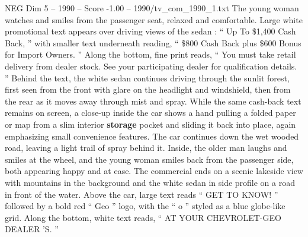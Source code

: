\begin{textsample}{NEG Dim 5 – 1990 – Score -1.00 – 1990/tv\_com\_1990\_1.txt}
The young woman watches and smiles from the passenger seat, relaxed and comfortable.
Large white promotional text appears over driving views of the sedan : “ Up To \$1,400 Cash Back, ” with smaller text underneath reading, “ \$800 Cash Back plus \$600 Bonus for Import Owners. ” Along the bottom, fine print reads, “ You must take retail delivery from dealer stock.
See your participating dealer for qualification details. ” Behind the text, the white sedan continues driving through the sunlit forest, first seen from the front with glare on the headlight and windshield, then from the rear as it moves away through mist and spray.
While the same cash-back text remains on screen, a close-up inside the car shows a hand pulling a folded paper or map from a slim interior \textbf{storage} pocket and sliding it back into place, again emphasizing small convenience features.
The car continues down the wet wooded road, leaving a light trail of spray behind it.
Inside, the older man laughs and smiles at the wheel, and the young woman smiles back from the passenger side, both appearing happy and at ease.
The commercial ends on a scenic lakeside view with mountains in the background and the white sedan in side profile on a road in front of the water.
Above the car, large text reads “ GET TO KNOW! ” followed by a bold red “ Geo ” logo, with the “ o ” styled as a blue globe-like grid.
Along the bottom, white text reads, “ AT YOUR CHEVROLET-GEO DEALER ’S. ”

\end{textsample}
